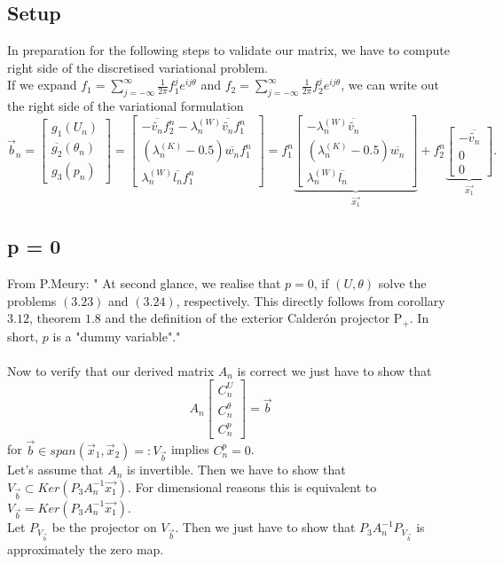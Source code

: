 \documentclass[10pt,journal,compsoc, onecolumn]{IEEEtran}
\begin{document}
\subsection{Setup}
In preparation for the following steps to validate our matrix, we have to compute right side of the discretised variational problem. \\
If we expand $f_1= \sum\limits_{j = -\infty}^\infty \frac{1}{2\pi}f_1^j e^{i j \theta}$ and $f_2= \sum\limits_{j = -\infty}^\infty \frac{1}{2\pi} f_2^j e^{i j \theta}$, we can write out the right side of the variational formulation
$$
\vec{b}_n = \begin{bmatrix}
   g_1(U_n)\\
    \overline{g_2}(\theta_n) \\
    g_3(p_n)
\end{bmatrix}
 = \begin{bmatrix}
    - \overline{\tilde{v_n}} f_2^n - \lambda_n^{(W)} \overline{\tilde{v_n}} f_1^n \\
    (\lambda_n^{(K)} - 0.5)  \overline{w_n} f_1^n\\
    \lambda_n^{(W)} \overline{l_n} f_1^n
\end{bmatrix}
= f_1^n 
\underbrace{
\begin{bmatrix}
- \lambda_n^{(W)} \overline{\tilde{v_n}} \\
(\lambda_n^{(K)} - 0.5) \overline{w_n}  \\
\lambda_n^{(W)} \overline{l_n}
\end{bmatrix}}_{\vec{x_1}}
+ f_2^n
\underbrace{\begin{bmatrix}
    - \overline{\tilde{v_n}} \\
    0 \\
    0
\end{bmatrix}}_{\vec{x_1}}.
$$
\subsection{p = 0}
From P.Meury:
" At second glance, we realise that \(p=0\), if \((U, \theta)\) solve the problems \((3.23)\) and \((3.24)\), respectively.
This directly follows from corollary \(3.12\), theorem \(1.8\) and the definition of the exterior Calderón
projector \(\mathrm{P}_{+}\). In short, \(p\) is a "dummy variable"." \\
\\
Now to verify that our derived matrix $A_n$ is correct we just have to show that 
$$
A_n \begin{bmatrix}
   C_n^U \\
    C_n^\theta \\
    C_n^p
\end{bmatrix} = \vec{b}
$$
for $\vec{b} \in span( \vec{x}_1, \vec{x}_2) =: V_{\vec{b}}$ implies $C_n^p = 0$. \\
Let's assume that $A_n$ is invertible. 
Then we have to show that $ V_{\vec{b}} \subset Ker(P_3A_n^{-1}\vec{x_1})$.
For dimensional reasons this is equivalent to  $ V_{\vec{b}} = Ker(P_3A_n^{-1}\vec{x_1})$.\\
Let $P_{V_{\vec{b}}}$ be the projector on $V_{\vec{b}}$.
Then we just have to show that $P_3A_n^{-1}P_{V_{\vec{b}}}$ is approximately the zero map. 
\end{document}
